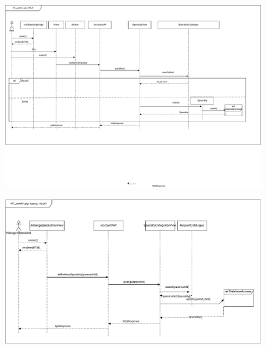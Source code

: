 \begin{figure}[ht!]
	\centering
	\includegraphics[scale=0.8]{figs/design-sequence/3-42.pdf}
\end{figure}

\FloatBarrier
\newpage

\eject \pdfpagewidth=11in \pdfpageheight=9in

\begin{figure}[ht!]
	\centering
	\includegraphics[scale=0.8]{figs/design-sequence/3-43.pdf}
\end{figure}

\FloatBarrier
\newpage

\eject \pdfpagewidth=11in \pdfpageheight=9in

